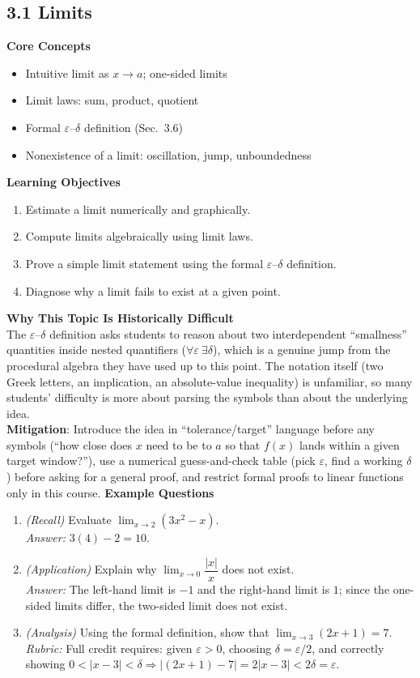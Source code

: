 \documentclass[11pt]{article}
\begin{document}
\subsection{3.1 Limits}
\textbf{Core Concepts}
\begin{itemize}
\item Intuitive limit as $x\to a$; one-sided limits
\item Limit laws: sum, product, quotient
\item Formal $\varepsilon$--$\delta$ definition (Sec.\ 3.6)
\item Nonexistence of a limit: oscillation, jump, unboundedness
\end{itemize}
\textbf{Learning Objectives}
\begin{enumerate}
\item Estimate a limit numerically and graphically.
\item Compute limits algebraically using limit laws.
\item Prove a simple limit statement using the formal $\varepsilon$--$\delta$ definition.
\item Diagnose why a limit fails to exist at a given point.
\end{enumerate}
\textbf{Why This Topic Is Historically Difficult} \\
The $\varepsilon$--$\delta$ definition asks students to reason about two interdependent ``smallness'' quantities inside nested quantifiers ($\forall \varepsilon\ \exists \delta$), which is a genuine jump from the procedural algebra they have used up to this point. The notation itself (two Greek letters, an implication, an absolute-value inequality) is unfamiliar, so many students' difficulty is more about parsing the symbols than about the underlying idea. \\
\textbf{Mitigation}: Introduce the idea in ``tolerance/target'' language before any symbols (``how close does $x$ need to be to $a$ so that $f(x)$ lands within a given target window?''), use a numerical guess-and-check table (pick $\varepsilon$, find a working $\delta$) before asking for a general proof, and restrict formal proofs to linear functions only in this course.
\textbf{Example Questions}
\begin{enumerate}
\item \emph{(Recall)} Evaluate $\displaystyle\lim_{x\to 2}(3x^2 - x)$. \\
\textit{Answer:} $3(4)-2 = 10$.
\item \emph{(Application)} Explain why $\displaystyle\lim_{x\to 0}\dfrac{|x|}{x}$ does not exist. \\
\textit{Answer:} The left-hand limit is $-1$ and the right-hand limit is $1$; since the one-sided limits differ, the two-sided limit does not exist.
\item \emph{(Analysis)} Using the formal definition, show that $\displaystyle\lim_{x\to 3}(2x+1)=7$. \\
\textit{Rubric:} Full credit requires: given $\varepsilon>0$, choosing $\delta = \varepsilon/2$, and correctly showing $0<|x-3|<\delta \Rightarrow |(2x+1)-7|=2|x-3|<2\delta=\varepsilon$.
\end{enumerate}
\end{document}
